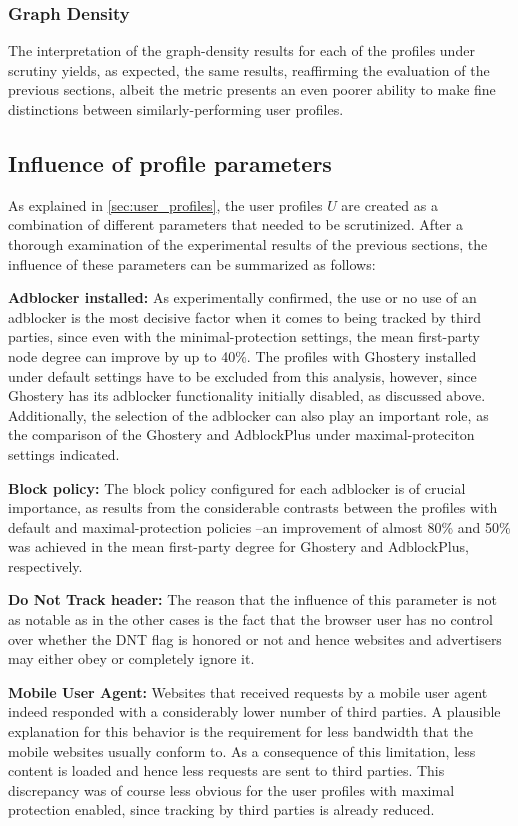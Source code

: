 \documentclass{sig-alternate}
\begin{document}
\subsubsection{Graph Density}
{\color{blue}The interpretation of the graph-density results for each of the profiles under scrutiny yields, as expected, the same results, reaffirming the evaluation of the previous sections, albeit the metric presents an even poorer ability to make fine distinctions between similarly-performing user profiles.}

\subsection{Influence of profile parameters}
{\color{blue}As explained in \ref{sec:user_profiles}, the user profiles $U$ are created as a combination of different parameters that needed to be scrutinized. After a thorough examination of the experimental results of the previous sections, the influence of these parameters can be summarized as follows:

\textbf{Adblocker installed:} As experimentally confirmed, the use or no use of an adblocker is the most decisive factor when it comes to being tracked by third parties, since even with the minimal-protection settings, the mean first-party node degree can improve by up to 40\%. The profiles with Ghostery installed under default settings have to be excluded from this analysis, however, since Ghostery has its adblocker functionality initially disabled, as discussed above. Additionally, the selection of the adblocker can also play an important role, as the comparison of the Ghostery and AdblockPlus under maximal-proteciton settings indicated.

\textbf{Block policy:} The block policy configured for each adblocker is of crucial importance, as results from the considerable contrasts between the profiles with default and maximal-protection policies --an improvement of almost 80\% and 50\% was achieved in the mean first-party degree for Ghostery and AdblockPlus, respectively.

\textbf{Do Not Track header:} The reason that the influence of this parameter is not as notable as in the other cases is the fact that the browser user has no control over whether the DNT flag is honored or not and hence websites and advertisers may either obey or completely ignore it.

\textbf{Mobile User Agent:} Websites that received requests by a mobile user agent indeed responded with a considerably lower number of third parties. A plausible explanation for this behavior is the requirement for less bandwidth that the mobile websites usually conform to. As a consequence of this limitation, less content is loaded and hence less requests are sent to third parties. This discrepancy was of course less obvious for the user profiles with maximal protection enabled, since tracking by third parties is already reduced.

}
\end{document}
